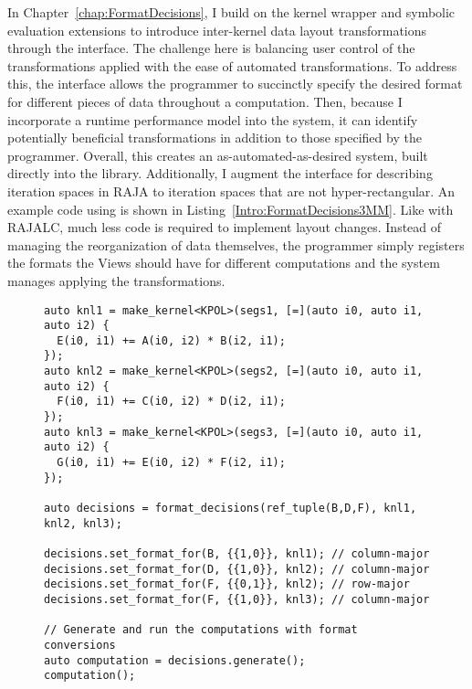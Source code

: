 In Chapter~\ref{chap:FormatDecisions}, I build on the kernel wrapper and symbolic evaluation extensions to introduce inter-kernel data layout transformations through the \FormatDecisions{} interface.
The challenge here is balancing user control of the transformations applied with the ease of automated transformations.
To address this, the interface allows the programmer to succinctly specify the desired format for different pieces of data throughout a computation.
Then, because I incorporate a runtime performance model into the system, it can identify potentially beneficial transformations in addition to those specified by the programmer.
Overall, this creates an as-automated-as-desired system, built directly into the library.
Additionally, I augment the interface for describing iteration spaces in RAJA to iteration spaces that are not hyper-rectangular.
An example code using \FormatDecisions{} is shown in Listing~\ref{Intro:FormatDecisions3MM}.
Like with RAJALC, much less code is required to implement layout changes.
Instead of managing the reorganization of data themselves, the programmer simply registers the formats the Views should have for different computations and the system manages applying the transformations.

\begin{figure}
\begin{lstlisting}[caption={Changing data layouts for three Views in the \textsc{3mm} benchmark using \FormatDecisions.},
  label={Intro:FormatDecisions3MM}]
auto knl1 = make_kernel<KPOL>(segs1, [=](auto i0, auto i1, auto i2) {
  E(i0, i1) += A(i0, i2) * B(i2, i1);
});
auto knl2 = make_kernel<KPOL>(segs2, [=](auto i0, auto i1, auto i2) {
  F(i0, i1) += C(i0, i2) * D(i2, i1);
});
auto knl3 = make_kernel<KPOL>(segs3, [=](auto i0, auto i1, auto i2) {
  G(i0, i1) += E(i0, i2) * F(i2, i1);
});

auto decisions = format_decisions(ref_tuple(B,D,F), knl1, knl2, knl3);

decisions.set_format_for(B, {{1,0}}, knl1); // column-major
decisions.set_format_for(D, {{1,0}}, knl2); // column-major
decisions.set_format_for(F, {{0,1}}, knl2); // row-major
decisions.set_format_for(F, {{1,0}}, knl3); // column-major

// Generate and run the computations with format conversions
auto computation = decisions.generate();
computation();
\end{lstlisting}
\end{figure}

